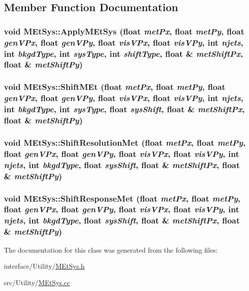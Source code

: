 \subsection{Member Function Documentation}
\hypertarget{classMEtSys_a845ef3f7f0420219c79c81dea8a326b8}{
\subsubsection[{ApplyMEtSys}]{\setlength{\rightskip}{0pt plus 5cm}void MEtSys::ApplyMEtSys (float {\em metPx}, \/  float {\em metPy}, \/  float {\em genVPx}, \/  float {\em genVPy}, \/  float {\em visVPx}, \/  float {\em visVPy}, \/  int {\em njets}, \/  int {\em bkgdType}, \/  int {\em sysType}, \/  int {\em shiftType}, \/  float \& {\em metShiftPx}, \/  float \& {\em metShiftPy})}}
\label{classMEtSys_a845ef3f7f0420219c79c81dea8a326b8}
\hypertarget{classMEtSys_a6363f250899177442b8662bbe266699a}{
\subsubsection[{ShiftMEt}]{\setlength{\rightskip}{0pt plus 5cm}void MEtSys::ShiftMEt (float {\em metPx}, \/  float {\em metPy}, \/  float {\em genVPx}, \/  float {\em genVPy}, \/  float {\em visVPx}, \/  float {\em visVPy}, \/  int {\em njets}, \/  int {\em bkgdType}, \/  int {\em sysType}, \/  float {\em sysShift}, \/  float \& {\em metShiftPx}, \/  float \& {\em metShiftPy})}}
\label{classMEtSys_a6363f250899177442b8662bbe266699a}
\hypertarget{classMEtSys_a97e00588ed003eeb90730ff2ac4be9f8}{
\subsubsection[{ShiftResolutionMet}]{\setlength{\rightskip}{0pt plus 5cm}void MEtSys::ShiftResolutionMet (float {\em metPx}, \/  float {\em metPy}, \/  float {\em genVPx}, \/  float {\em genVPy}, \/  float {\em visVPx}, \/  float {\em visVPy}, \/  int {\em njets}, \/  int {\em bkgdType}, \/  float {\em sysShift}, \/  float \& {\em metShiftPx}, \/  float \& {\em metShiftPy})}}
\label{classMEtSys_a97e00588ed003eeb90730ff2ac4be9f8}
\hypertarget{classMEtSys_ac0f73d0c4b0f762f3326e389e30380b7}{
\subsubsection[{ShiftResponseMet}]{\setlength{\rightskip}{0pt plus 5cm}void MEtSys::ShiftResponseMet (float {\em metPx}, \/  float {\em metPy}, \/  float {\em genVPx}, \/  float {\em genVPy}, \/  float {\em visVPx}, \/  float {\em visVPy}, \/  int {\em njets}, \/  int {\em bkgdType}, \/  float {\em sysShift}, \/  float \& {\em metShiftPx}, \/  float \& {\em metShiftPy})}}
\label{classMEtSys_ac0f73d0c4b0f762f3326e389e30380b7}


The documentation for this class was generated from the following files:\begin{DoxyCompactItemize}
\item 
interface/Utility/\hyperlink{MEtSys_8h}{MEtSys.h}\item 
src/Utility/\hyperlink{MEtSys_8cc}{MEtSys.cc}\end{DoxyCompactItemize}

